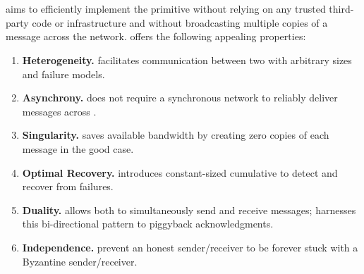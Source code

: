 \section{\Shadow{}}
\label{s:algo}
\Scrooge{} aims to efficiently implement the \CCC{} primitive without relying 
on any trusted third-party code or infrastructure and without broadcasting 
multiple copies of a message across the network.
%
\Scrooge{} offers the following appealing properties:
\begin{enumerate}[wide,nosep,label=(P\arabic*),ref={P\arabic*}]
\item \label{g:hetero} {\bf Heterogeneity.}
\Scrooge{} facilitates communication between two  with arbitrary sizes and failure models.

\item \label{g:async} {\bf Asynchrony.}
\Scrooge{} does not require a synchronous network to reliably deliver messages across .

\item \label{g:single} {\bf Singularity.}
\Scrooge{} saves available bandwidth by creating zero copies of each message in the good case.

\item \label{g:recovery} {\bf Optimal Recovery.}
\Scrooge{} introduces constant-sized cumulative  to detect and recover from failures.

\item \label{g:bidrect} {\bf Duality.}
\Scrooge{} allows both  to simultaneously send and receive messages;
\Scrooge{} harnesses this bi-directional pattern to piggyback acknowledgments.

\item \label{g:indepen} {\bf Independence.}
\Scrooge{} prevent an honest sender/receiver to be forever stuck with a Byzantine 
sender/receiver.

\end{enumerate}

